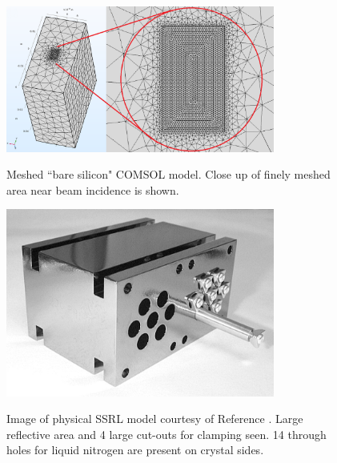 \documentclass{iucr}
\begin{document}
\begin{figure}
\caption{Meshed ``bare silicon" COMSOL model. Close up of finely meshed area near beam incidence is shown.}
\includegraphics[width = 8.85cm]{images/bare_silicon.png}
\label{fig:bare_silicon}
\end{figure}


\begin{figure}
\caption{Image of physical SSRL model courtesy of Reference \cite{stanford}. Large reflective area and 4 large cut-outs for clamping seen. 14 through holes for liquid nitrogen are present on crystal sides.}
\includegraphics[width = 8.85cm]{images/ssrlsilicon.jpg}
\label{fig:ssrl_silicon}
\end{figure}




\end{document}
